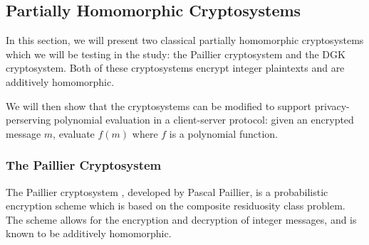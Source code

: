 \subsection{Partially Homomorphic Cryptosystems}
In this section, we will present two classical partially homomorphic cryptosystems which we will be testing in the study: the Paillier cryptosystem and the DGK cryptosystem. Both of these cryptosystems encrypt integer plaintexts and are additively homomorphic.

We will then show that the cryptosystems can be modified to support privacy-perserving polynomial evaluation in a client-server protocol: given an encrypted message $m$, evaluate $f(m)$ where $f$ is a polynomial function.

\subsubsection{The Paillier Cryptosystem}
The Paillier cryptosystem \cite{stern_public-key_1999}, developed by Pascal Paillier, is a probabilistic encryption scheme which is based on the composite residuosity class problem. The scheme allows for the encryption and decryption of integer messages, and is known to be additively homomorphic. 



